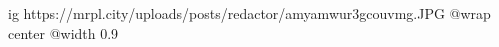  
 
 
 
 

\ifcmt
  ig https://mrpl.city/uploads/posts/redactor/amyamwur3gcouvmg.JPG
  @wrap center
  @width 0.9
\fi

